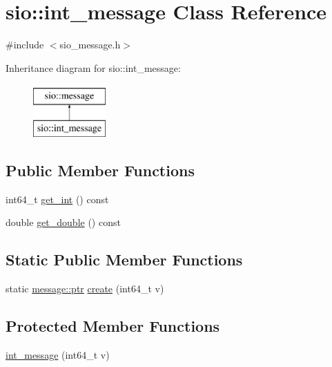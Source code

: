 \hypertarget{classsio_1_1int__message}{}\section{sio\+:\+:int\+\_\+message Class Reference}
\label{classsio_1_1int__message}


{\ttfamily \#include $<$sio\+\_\+message.\+h$>$}

Inheritance diagram for sio\+:\+:int\+\_\+message\+:\begin{figure}[H]
\begin{center}
\leavevmode
\includegraphics[height=2.000000cm]{classsio_1_1int__message}
\end{center}
\end{figure}
\subsection*{Public Member Functions}
\begin{DoxyCompactItemize}
\item 
int64\+\_\+t \hyperlink{classsio_1_1int__message_ad9159e1285bd3efd15b8f87699a9b133}{get\+\_\+int} () const
\item 
double \hyperlink{classsio_1_1int__message_a7fdc141b0fe04ce1b75054b6de110f2c}{get\+\_\+double} () const
\end{DoxyCompactItemize}
\subsection*{Static Public Member Functions}
\begin{DoxyCompactItemize}
\item 
static \hyperlink{classsio_1_1message_a6340b6fef57e4516eb17928b1885a615}{message\+::ptr} \hyperlink{classsio_1_1int__message_afdff250333f3bd5253465ca6dbc86c61}{create} (int64\+\_\+t v)
\end{DoxyCompactItemize}
\subsection*{Protected Member Functions}
\begin{DoxyCompactItemize}
\item 
\hyperlink{classsio_1_1int__message_a9d2da2260ddfdc421b5e0fb86a389a87}{int\+\_\+message} (int64\+\_\+t v)
\end{DoxyCompactItemize}
